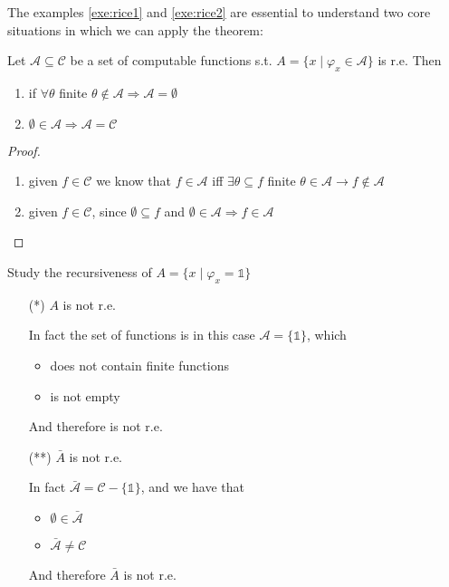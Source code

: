 The examples \ref{exe:rice1} and \ref{exe:rice2} are essential to
understand two core situations in which we can apply the theorem:
\begin{observation}
  Let $\mathcal{A} \subseteq \mathcal{C}$ be a set of computable
  functions s.t. $A = \{ x \mid \varphi_x \in \mathcal{A}\}$ is
  r.e. Then
  \begin{enumerate}[label=(i)]
  \item if \(\forall \theta \) finite
    \( \theta \notin \mathcal{A} \Rightarrow \mathcal{A} = \emptyset\)
  \item
    \(\emptyset \in \mathcal{A} \Rightarrow \mathcal{A} =
    \mathcal{C}\)
  \end{enumerate}

  \begin{proof}
    \begin{enumerate}[label=(i)]
    \item given $f \in \mathcal{C}$ we know that $f \in \mathcal{A}$
      iff $\exists \theta \subseteq f$ finite
      $\theta \in \mathcal{A} \rightarrow f \notin \mathcal{A}$
    \item given $f \in \mathcal{C}$, since $\emptyset \subseteq f$ and
      $\emptyset \in \mathcal{A} \Rightarrow f \in \mathcal{A}$
    \end{enumerate}
  \end{proof}
\end{observation}

\begin{exercise}
  Study the recursiveness of $A = \{x \mid \varphi_x = \mathds{1}\}$

  \begin{enumerate}
  \item[(*)] $A$ is not r.e.

    In fact the set of functions is in this case
    $\mathcal{A} = \{\mathds{1}\}$, which
    \begin{itemize}
    \item does not contain finite functions
    \item is not empty
    \end{itemize}
    And therefore is not r.e.

  \item[(**)] $\bar{A}$ is not r.e.

    In fact $\bar{\mathcal{A}} = \mathcal{C} - \{\mathds{1}\}$, and we
    have that
    \begin{itemize}
    \item $\emptyset \in \bar{\mathcal{A}}$
    \item $\bar{\mathcal{A}} \neq \mathcal{C}$
    \end{itemize}
    And therefore $\bar{A}$ is not r.e.
  \end{enumerate}
\end{exercise}

